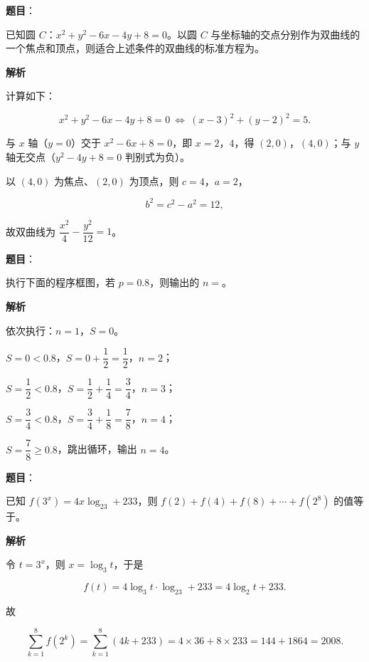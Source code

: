 \begin{answer}

\textbf{题目}：

已知圆 $C$：$x^2+y^2-6x-4y+8=0$。以圆 $C$ 与坐标轴的交点分别作为双曲线的一个焦点和顶点，则适合上述条件的双曲线的标准方程为\gkblank{}。

\textbf{解析}

计算如下：

\nopagebreak[4]
\[x^2+y^2-6x-4y+8=0\ \Longleftrightarrow\ (x-3)^2+(y-2)^2=5.\]

与 $x$ 轴（$y=0$）交于 $x^2-6x+8=0$，即 $x=2$，$4$，得 $(2,0)$，$(4,0)$；与 $y$ 轴无交点（$y^2-4y+8=0$ 判别式为负）。

以 $(4,0)$ 为焦点、$(2,0)$ 为顶点，则 $c=4$，$a=2$，

\nopagebreak[4]
\[b^2=c^2-a^2=12,\]

故双曲线为 $\dfrac{x^2}4-\dfrac{y^2}{12}=1$。


\end{answer}
\begin{answer}

\textbf{题目}：

执行下面的程序框图，若 $p=0.8$，则输出的 $n=$\gkblank{}。
\nopagebreak[4]
\begin{center}\end{center}
\nopagebreak[4]
\textbf{解析}

依次执行：$n=1$，$S=0$。

$S=0<0.8$，$S=0+\dfrac12=\dfrac12$，$n=2$；

$S=\dfrac12<0.8$，$S=\dfrac12+\dfrac14=\dfrac34$，$n=3$；

$S=\dfrac34<0.8$，$S=\dfrac34+\dfrac18=\dfrac78$，$n=4$；

$S=\dfrac78\geqslant0.8$，跳出循环，输出 $n=4$。


\end{answer}
\begin{answer}

\textbf{题目}：

已知 $f(3^x)=4x\log_23+233$，则 $f(2)+f(4)+f(8)+\cdots+f(2^8)$ 的值等于\gkblank{}。

\textbf{解析}

令 $t=3^x$，则 $x=\log_3t$，于是

\nopagebreak[4]
\[f(t)=4\log_3t\cdot\log_23+233=4\log_2t+233.\]

故

\nopagebreak[4]
\[\sum_{k=1}^{8}f(2^k)=\sum_{k=1}^{8}\left(4k+233\right)=4\times36+8\times233=144+1864=2008.\]


\end{answer}
